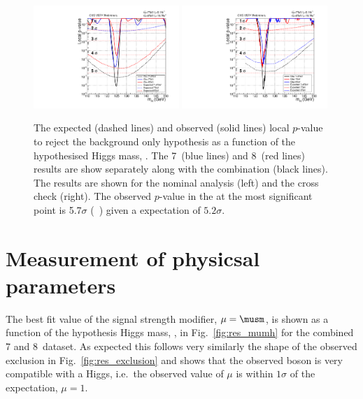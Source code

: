 \begin{figure}
  \includegraphics[width=0.49\textwidth]{analysis/plots/results/obspvalue.pdf}
  \includegraphics[width=0.49\textwidth]{analysis/plots/results/obspvalue_sideband.pdf}
  \caption[The expected and observed local $p$-value to reject the background hypothesis]{The expected (dashed lines) and observed (solid lines) local $p$-value to reject the background only hypothesis as a function of the hypothesised Higgs mass, \mH. The 7~\TeV (blue lines) and 8~\TeV (red lines) results are show separately along with the combination (black lines). The results are shown for the nominal \MFM analysis (left) and the cross check \SMVA (right). The observed $p$-value in the \MFM at the most significant point is 5.7$\sigma$ (~\GeV) given a \SM expectation of $5.2\sigma$. \plotupdate}
  \label{fig:res_pvalue}
\end{figure}

\section{Measurement of physicsal parameters}

The best fit value of the signal strength modifier, $\mu=\musm$, is shown as a function of the hypothesis Higgs mass, \mH, in Fig.~\ref{fig:res_mumh} for the combined 7 and 8~\TeV dataset. As expected this follows very similarly the shape of the observed exclusion in Fig.~\ref{fig:res_exclusion} and shows that the observed boson is very compatible with a \SM Higgs, i.e.~the observed value of $\mu$ is within $1\sigma$ of the \SM expectation, $\mu=1$. 

